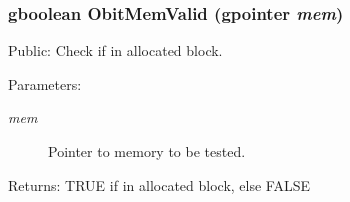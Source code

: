 \subsubsection{\setlength{\rightskip}{0pt plus 5cm}gboolean Obit\-Mem\-Valid (gpointer {\em mem})}\label{ObitMem_8h_a7}


Public: Check if in allocated block. 

\begin{Desc}
\item[Parameters:]
\begin{description}
\item[{\em mem}]Pointer to memory to be tested. \end{description}
\end{Desc}
\begin{Desc}
\item[Returns:]TRUE if in allocated block, else FALSE \end{Desc}
